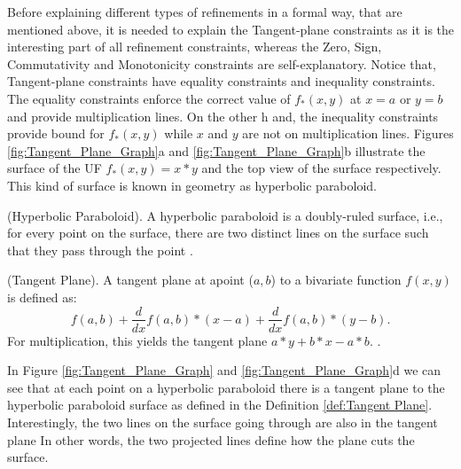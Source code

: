 \noindent Before explaining different types of refinements in a formal way, that are mentioned above, it is needed to explain the Tangent-plane constraints as it is the interesting part of all refinement constraints, whereas the Zero, Sign, Commutativity and Monotonicity constraints are self-explanatory.
Notice that, Tangent-plane constraints have equality constraints and inequality constraints.
The equality constraints enforce the correct value of  $f_{\ast}(x, y)$ at $x = a$ or $y = b$ and provide multiplication lines.
On the other h and, the inequality constraints provide bound for $f_{\ast}(x, y)$ while $x$ and $y$ are not on multiplication lines.
Figures \ref{fig:Tangent_Plane_Graph}a and \ref{fig:Tangent_Plane_Graph}b illustrate the surface of the UF $f_{\ast}(x, y) = x \ast y$ and the top view of the surface respectively.
This kind of surface is known in geometry as hyperbolic paraboloid.\newline

\begin{definition}
    (Hyperbolic Paraboloid).
    A hyperbolic paraboloid is a doubly-ruled surface, i.e., for every point on the surface, there are two distinct lines on the surface such that they pass through the point \cite{Cimatti:2018:ILS:3274693.3230639}.
 \end{definition}
 
 
\begin{definition}
\label{def:Tangent Plane}
    (Tangent Plane).
    A tangent plane at apoint ($a, b$) to a bivariate function $f(x, y)$ is defined as:
    $$f(a, b) + \frac{d}{dx} f(a, b) \ast (x-a) + \frac{d}{dx} f(a, b) \ast (y-b).$$
    For multiplication, this yields the tangent plane $a \ast y + b \ast x - a \ast b$.
    \cite{TangentPlane}.
 \end{definition}

\noindent In Figure \ref{fig:Tangent_Plane_Graph} and \ref{fig:Tangent_Plane_Graph}d we can see that at each point on a hyperbolic paraboloid there is a tangent plane to the hyperbolic paraboloid surface as defined in the Definition \ref{def:Tangent Plane}.
Interestingly, the two lines on the surface going through are also in the tangent plane 
In other words, the two projected lines define how the plane cuts the surface.\newpage

